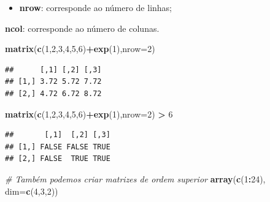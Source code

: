\documentclass[
]{book}
\newenvironment{Shaded}{\begin{snugshade}}{\end{snugshade}}
\newcommand{\AttributeTok}[1]{\textcolor[rgb]{0.13,0.29,0.53}{#1}}
\newcommand{\CommentTok}[1]{\textcolor[rgb]{0.56,0.35,0.01}{\textit{#1}}}
\newcommand{\DecValTok}[1]{\textcolor[rgb]{0.00,0.00,0.81}{#1}}
\newcommand{\FunctionTok}[1]{\textcolor[rgb]{0.13,0.29,0.53}{\textbf{#1}}}
\newcommand{\NormalTok}[1]{#1}
\newcommand{\SpecialCharTok}[1]{\textcolor[rgb]{0.81,0.36,0.00}{\textbf{#1}}}
\providecommand{\tightlist}{%
  \setlength{\itemsep}{0pt}\setlength{\parskip}{0pt}}
\begin{document}
\begin{itemize}
\tightlist
\item
  \textbf{nrow}: corresponde ao número de linhas;
\end{itemize}

\textbf{ncol}: corresponde ao número de colunas.

\begin{Shaded}
\begin{Highlighting}[]
\FunctionTok{matrix}\NormalTok{(}\FunctionTok{c}\NormalTok{(}\DecValTok{1}\NormalTok{,}\DecValTok{2}\NormalTok{,}\DecValTok{3}\NormalTok{,}\DecValTok{4}\NormalTok{,}\DecValTok{5}\NormalTok{,}\DecValTok{6}\NormalTok{)}\SpecialCharTok{+}\FunctionTok{exp}\NormalTok{(}\DecValTok{1}\NormalTok{),}\AttributeTok{nrow=}\DecValTok{2}\NormalTok{)}
\end{Highlighting}
\end{Shaded}

\begin{verbatim}
##      [,1] [,2] [,3]
## [1,] 3.72 5.72 7.72
## [2,] 4.72 6.72 8.72
\end{verbatim}

\begin{Shaded}
\begin{Highlighting}[]
\FunctionTok{matrix}\NormalTok{(}\FunctionTok{c}\NormalTok{(}\DecValTok{1}\NormalTok{,}\DecValTok{2}\NormalTok{,}\DecValTok{3}\NormalTok{,}\DecValTok{4}\NormalTok{,}\DecValTok{5}\NormalTok{,}\DecValTok{6}\NormalTok{)}\SpecialCharTok{+}\FunctionTok{exp}\NormalTok{(}\DecValTok{1}\NormalTok{),}\AttributeTok{nrow=}\DecValTok{2}\NormalTok{) }\SpecialCharTok{\textgreater{}} \DecValTok{6}
\end{Highlighting}
\end{Shaded}

\begin{verbatim}
##       [,1]  [,2] [,3]
## [1,] FALSE FALSE TRUE
## [2,] FALSE  TRUE TRUE
\end{verbatim}

\begin{Shaded}
\begin{Highlighting}[]
\CommentTok{\# Também podemos criar matrizes de ordem superior}
\FunctionTok{array}\NormalTok{(}\FunctionTok{c}\NormalTok{(}\DecValTok{1}\SpecialCharTok{:}\DecValTok{24}\NormalTok{), }\AttributeTok{dim=}\FunctionTok{c}\NormalTok{(}\DecValTok{4}\NormalTok{,}\DecValTok{3}\NormalTok{,}\DecValTok{2}\NormalTok{))}
\end{Highlighting}
\end{Shaded}
\end{document}
